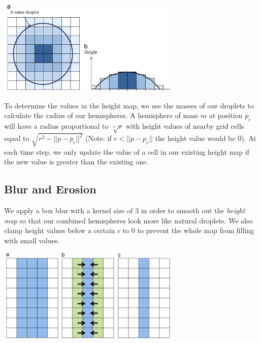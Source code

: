 \documentclass[10pt,twocolumn,letterpaper]{article}
\newenvironment{Figure}
  {\par\medskip\noindent\minipage{\linewidth}}
  {\endminipage\par\medskip}
\begin{document}
\begin{Figure}
    \centering
    \includegraphics[width=250pt]{height.png}
    \label{fig:heightdiag}
\end{Figure}

To determine the values in the height map, we use the masses of our droplets to calculate the radius of our hemispheres. A hemisphere of mass $m$ at position $p_c$ will have a radius proportional to $\sqrt[3]{r}$ with height values of nearby grid cells equal to $\sqrt{r^2 - ||p - p_c||^2}$ (Note: if $r<||p-p_c||$ the height value would be 0). At each time step, we only update the value of a cell in our existing height map if the new value is greater than the existing one.

\subsection{Blur and Erosion}

We apply a box blur with a kernel size of 3 in order to smooth out the \emph{height map} so that our combined hemispheres look more like natural droplets. We also clamp height values below a certain $\epsilon$ to 0 to prevent the whole map from filling with small values.

\begin{Figure}
    \centering
    \includegraphics[width=250pt]{erosion.png}
    \label{fig:erosion}
\end{Figure}
\end{document}
